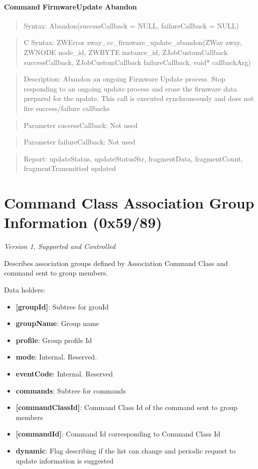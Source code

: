 \paragraph{Command FirmwareUpdate Abandon}
\begin{quote}Syntax: Abandon(successCallback = NULL, failureCallback = NULL)\end{quote}
\begin{quote}C Syntax: ZWError zway\_cc\_firmware\_update\_abandon(ZWay zway, ZWNODE node\_id, ZWBYTE instance\_id, ZJobCustomCallback successCallback, ZJobCustomCallback failureCallback, void* callbackArg)\end{quote}
\begin{quote}Description: Abandon an ongoing Firmware Update process. Stop responding to an ongoing update process and erase the firmware data prepared for the update. This call is executed synchroneously and does not fire success/failure callbacks\end{quote}
\begin{quote}Parameter successCallback: Not used\end{quote}
\begin{quote}Parameter failureCallback: Not used\end{quote}
\begin{quote}Report: updateStatus, updateStatusStr, fragmentData, fragmentCount, fragmentTransmitted updated\end{quote}


\section{Command Class Association Group Information (0x59/89)}

\textit{Version 1, Supported and Controlled}
\newline

Describes association groups defined by Association Command Class and command sent to group members.
\newline

\noindent
Data holders:

\begin{itemize}
\item \textbf{[groupId]}: Subtree for grouId
\item \qquad\textbf{groupName}: Group name
\item \qquad\textbf{profile}: Group profile Id
\item \qquad\textbf{mode}: Internal. Reserved.
\item \qquad\textbf{eventCode}: Internal. Reserved
\item \qquad\textbf{commands}: Subtree for commands
\item \qquad\qquad\textbf{[commandClassId]}: Command Class Id of the command sent to group members
\item \qquad\qquad\qquad\textbf{[commandId]}: Command Id corresponding to Command Class Id
\item \textbf{dynamic}: Flag describing if the list can change and periodic request to update information is suggested
\end{itemize}

